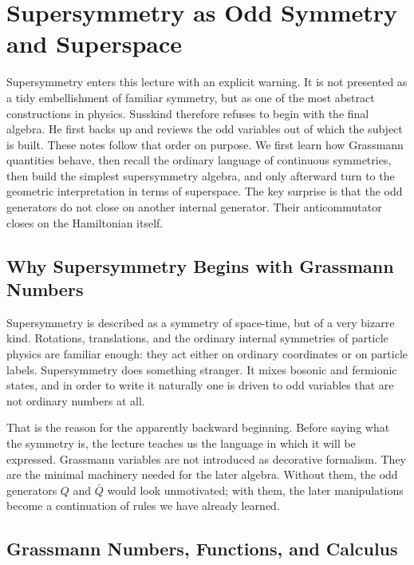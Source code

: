 \chapter{Supersymmetry as Odd Symmetry and Superspace}

Supersymmetry enters this lecture with an explicit warning. It is not presented as a tidy embellishment of familiar symmetry, but as one of the most abstract constructions in physics. Susskind therefore refuses to begin with the final algebra. He first backs up and reviews the odd variables out of which the subject is built. These notes follow that order on purpose. We first learn how Grassmann quantities behave, then recall the ordinary language of continuous symmetries, then build the simplest supersymmetry algebra, and only afterward turn to the geometric interpretation in terms of superspace. The key surprise is that the odd generators do not close on another internal generator. Their anticommutator closes on the Hamiltonian itself.

\section{Why Supersymmetry Begins with Grassmann Numbers}

Supersymmetry is described as a symmetry of space-time, but of a very bizarre kind. Rotations, translations, and the ordinary internal symmetries of particle physics are familiar enough: they act either on ordinary coordinates or on particle labels. Supersymmetry does something stranger. It mixes bosonic and fermionic states, and in order to write it naturally one is driven to odd variables that are not ordinary numbers at all.

That is the reason for the apparently backward beginning. Before saying what the symmetry is, the lecture teaches us the language in which it will be expressed. Grassmann variables are not introduced as decorative formalism. They are the minimal machinery needed for the later algebra. Without them, the odd generators \(Q\) and \(\bar Q\) would look unmotivated; with them, the later manipulations become a continuation of rules we have already learned.

\section{Grassmann Numbers, Functions, and Calculus}

